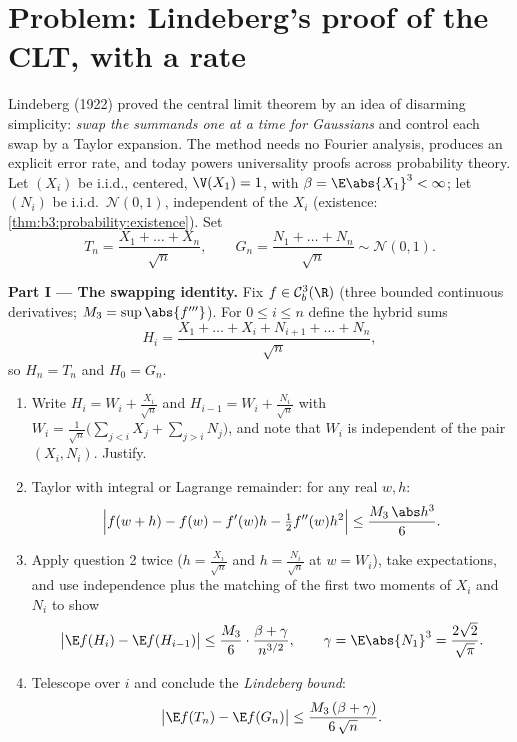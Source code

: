 \section{Problem: Lindeberg's proof of the CLT, with a
rate}

\begin{problem}
\label{pb:b3:clt:1}
Lindeberg (1922) proved the central limit theorem by an idea
of disarming simplicity: \emph{swap the summands one at a
time for Gaussians} and control each swap by a Taylor
expansion. The method needs no Fourier analysis, produces an
explicit error rate, and today powers universality proofs
across probability theory. Let $(X_i)$ be i.i.d., centered,
$\V(X_1) = 1$, with $\beta = \E\abs{X_1}^3 < \infty$; let
$(N_i)$ be i.i.d.\ $\mathcal N(0,1)$, independent of the
$X_i$ (existence: \cref{thm:b3:probability:existence}). Set
\[
T_n = \frac{X_1 + \dots + X_n}{\sqrt n},
\qquad
G_n = \frac{N_1 + \dots + N_n}{\sqrt n} \sim \mathcal N(0,1).
\]

\medskip
\noindent\textbf{Part I --- The swapping identity.} Fix $f
\in \mathcal C^3_b(\R)$ (three bounded continuous
derivatives; $M_3 = \sup\abs{f'''}$). For $0 \leq i \leq n$
define the hybrid sums
\[
H_i = \frac{X_1 + \dots + X_i + N_{i+1} + \dots +
N_n}{\sqrt n},
\]
so $H_n = T_n$ and $H_0 = G_n$.
\begin{enumerate}
  \item Write $H_i = W_i + \frac{X_i}{\sqrt n}$ and $H_{i-1}
        = W_i + \frac{N_i}{\sqrt n}$ with $W_i =
        \frac{1}{\sqrt n}\bigl(\sum_{j<i}X_j +
        \sum_{j>i}N_j\bigr)$, and note that $W_i$ is
        independent of the pair $(X_i, N_i)$. Justify.
  \item Taylor with integral or Lagrange remainder: for any
        real $w, h$:
        \[
        \Bigl|f(w + h) - f(w) - f'(w)h -
        \tfrac12f''(w)h^2\Bigr| \leq
        \frac{M_3\,\abs h^3}{6} .
        \]
  \item Apply question 2 twice ($h = \frac{X_i}{\sqrt n}$ and
        $h = \frac{N_i}{\sqrt n}$ at $w = W_i$), take
        expectations, and use independence plus the matching
        of the first two moments of $X_i$ and $N_i$ to show
        \[
        \bigl|\E f(H_i) - \E f(H_{i-1})\bigr|
        \leq \frac{M_3}{6}\cdot
        \frac{\beta + \gamma}{n^{3/2}},
        \qquad \gamma = \E\abs{N_1}^3 =
        \frac{2\sqrt2}{\sqrt\pi} .
        \]
  \item Telescope over $i$ and conclude the \emph{Lindeberg
        bound}:
        \[
        \bigl|\E f(T_n) - \E f(G_n)\bigr| \leq
        \frac{M_3\,(\beta + \gamma)}{6\,\sqrt n} .
        \]
\end{enumerate}


\end{problem}
